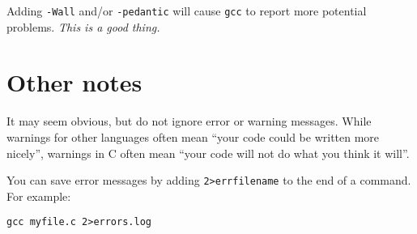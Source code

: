 Adding \texttt{-Wall} and/or \texttt{-pedantic} will cause \texttt{gcc} to report more potential problems.
\emph{This is a good thing.}

\section{Other notes}
It may seem obvious, but do not ignore error or warning messages.
While warnings for other languages often mean ``your code could be written more nicely'', warnings in C often mean ``your code will not do what you think it will''.

You can save error messages by adding \verb|2>errfilename| to the end of a command.
For example:
\begin{verbatim}
gcc myfile.c 2>errors.log
\end{verbatim}




